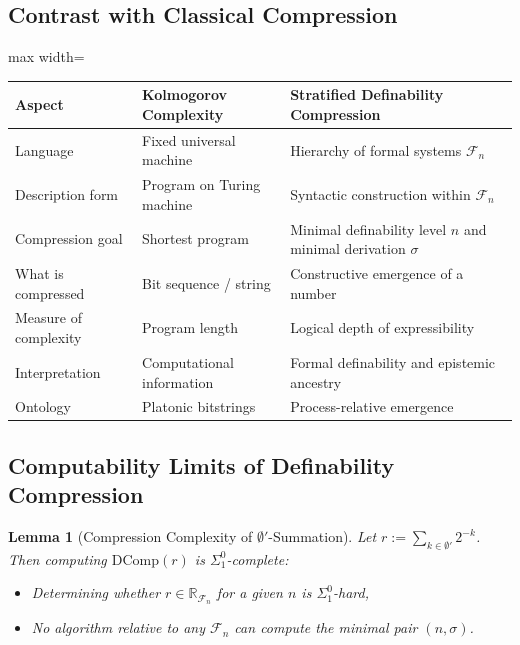 \documentclass[12pt]{article}
\theoremstyle{definition}
\theoremstyle{plain}
\newtheorem{lemma}[definition]{Lemma}
\theoremstyle{remark}
\begin{document}
\subsection*{Contrast with Classical Compression}

\vspace{0.5em}
\begin{adjustbox}{max width=\textwidth}
\begin{tabular}{@{}|p{4.2cm}|p{5.2cm}|p{6cm}|@{}}
\hline
\textbf{Aspect} & \textbf{Kolmogorov Complexity} & \textbf{Stratified Definability Compression} \\
\hline
Language & Fixed universal machine & Hierarchy of formal systems \( \mathcal{F}_n \) \\
\hline
Description form & Program on Turing machine & Syntactic construction within \( \mathcal{F}_n \) \\
\hline
Compression goal & Shortest program & Minimal definability level \( n \) and minimal derivation \( \sigma \) \\
\hline
What is compressed & Bit sequence / string & Constructive emergence of a number \\
\hline
Measure of complexity & Program length & Logical depth of expressibility \\
\hline
Interpretation & Computational information & Formal definability and epistemic ancestry \\
\hline
Ontology & Platonic bitstrings & Process-relative emergence \\
\hline
\end{tabular}
\end{adjustbox}
\vspace{0.5em}

\subsection*{Computability Limits of Definability Compression}

\begin{lemma}[Compression Complexity of $\emptyset'$-Summation]
Let \( r := \sum_{k \in \emptyset'} 2^{-k} \). Then computing \( \mathrm{DComp}(r) \) is \( \Sigma^0_1 \)-complete:
\begin{itemize}
    \item Determining whether \( r \in \mathbb{R}_{\mathcal{F}_n} \) for a given \( n \) is \( \Sigma^0_1 \)-hard,
    \item No algorithm relative to any \( \mathcal{F}_n \) can compute the minimal pair \( (n, \sigma) \).
\end{itemize}
\end{lemma}
\end{document}
